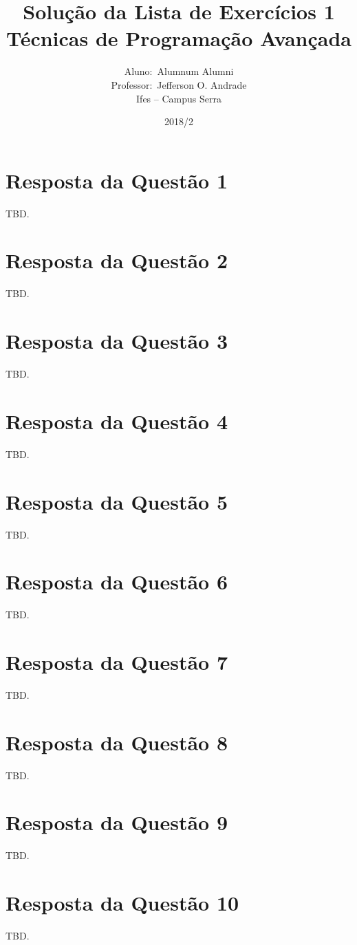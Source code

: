 \documentclass[a4paper,12pt]{scrartcl}
\title{Solução da Lista de Exercícios 1\\
  Técnicas de Programação Avançada}
\author{\textsf{Aluno:}~Alumnum Alumni\\
  \textsf{Professor:}~Jefferson O. Andrade\\
  Ifes -- Campus Serra}
\date{2018/2}
\begin{document}
\maketitle

\section{Resposta da Questão 1}

TBD.

\section{Resposta da Questão 2}

TBD.

\section{Resposta da Questão 3}

TBD.

\section{Resposta da Questão 4}

TBD.

\section{Resposta da Questão 5}

TBD.

\section{Resposta da Questão 6}

TBD.

\section{Resposta da Questão 7}

TBD.

\section{Resposta da Questão 8}

TBD.

\section{Resposta da Questão 9}

TBD.

\section{Resposta da Questão 10}

TBD.
\end{document}

